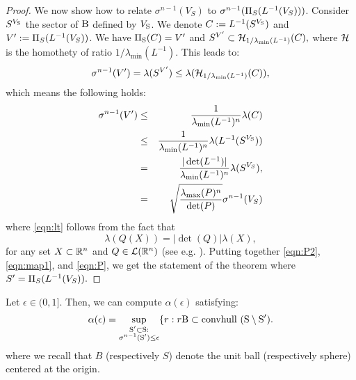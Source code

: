 \begin{proof}

We now show how to relate $\sigma^{n-1}(V_S)$ to $\sigma^{n-1}(\Pi_S(L^{-1}(V_S)))$. Consider $S^{V_{\text{S}}}$ the sector of $\text{B}$ defined by $V_{\text{S}}$. We denote $C:= L^{-1}(S^{V_{\text{S}}})$ and $V':=\Pi_S(L^{-1}(V_S))$. We have $\Pi_{\text{S}}(C) = V'$ and $S^{V'} \subset \mathcal{H}_{1/ \lambda_{\min}(L^{-1})}(C),$
where $\mathcal{H}$ is the homothety of ratio $1/ \lambda_{\min}(L^{-1})$. This leads to:
$$\sigma^{n-1}(V') = \lambda(S^{V'}) \leq \lambda (\mathcal{H}_{1/ \lambda_{\min}(L^{-1})}(C)),$$ which means the following holds:
\begin{eqnarray}\nonumber\sigma^{n-1}(V') &\leq& \frac{1}{\lambda_{\min}(L^{-1})^n}\lambda(C) \\
\nonumber &\leq&\frac{1}{\lambda_{\min}(L^{-1})^n} \lambda( L^{-1}(S^{V_{\text{S}}}))\\ 
\label{eqn:lt} &=&\frac{|\det(L^{-1})|}{\lambda_{\min}(L^{-1})^n}\lambda(S^{V_S}),\\
 \label{eqn:map1} &=&\sqrt{\frac{\lambda_{\max}(P)^n}{\det(P)}}\sigma^{n-1}(V_S)
\end{eqnarray}
where \eqref{eqn:lt} follows from the fact that
$$ \lambda(Q(X)) = |\det(Q)| \lambda(X),$$
for any set $X \subset \mathbb{R}^n$ and $Q \in \mathcal{L}(\mathbb{R}^n)$ (see e.g. \cite{rudin}).
Putting together \eqref{eqn:P2}, \eqref{eqn:map1}, and \eqref{eqn:P}, we get the statement of the theorem where $S' = \Pi_S(L^{-1}(V_S)).$
\end{proof}


\begin{lemma}\label{lemma:eps}Let $\epsilon \in (0, 1]$. Then, we can compute $\alpha(\epsilon)$ satisfying:
\begin{equation}\label{eqn:ballinc}\alpha(\epsilon) = \sup_{\substack{\text{S}' \subset \text{S}: \\  \sigma^{n-1}(\text{S}') \leq \epsilon}}\{r: r\text{B} \subset \mbox{convhull }(\text{S} \setminus \text{S}').
\end{equation}
where we recall that $B$ (respectively $S$) denote the unit ball (respectively sphere) centered at the origin.
\end{lemma}

